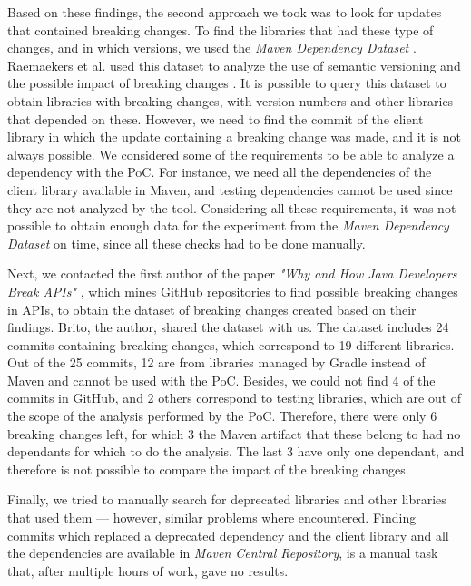 Based on these findings, the second approach we took was to look for updates that contained breaking changes. To find the libraries that had these type of changes, and in which versions, we used the \textit{Maven Dependency Dataset} \cite{Raemaekers2013}. Raemaekers et al. used this dataset to analyze the use of semantic versioning and the possible impact of breaking changes \cite{Raemaekers2017}. It is possible to query this dataset to obtain libraries with breaking changes, with version numbers and other libraries that depended on these. However, we need to find the commit of the client library in which the update containing a breaking change was made, and it is not always possible. We considered some of the requirements to be able to analyze a dependency with the PoC. For instance, we need all the dependencies of the client library available in Maven, and testing dependencies cannot be used since they are not analyzed by the tool. Considering all these requirements, it was not possible to obtain enough data for the experiment from the \textit{Maven Dependency Dataset} on time, since all these checks had to be done manually.

Next, we contacted the first author of the paper \textit{"Why and How Java Developers Break APIs"} \cite{Brito2018}, which mines GitHub repositories to find possible breaking changes in APIs, to obtain the dataset of breaking changes created based on their findings. Brito, the author, shared the dataset with us. The dataset includes 24 commits containing breaking changes, which correspond to 19 different libraries. Out of the 25 commits, 12 are from libraries managed by Gradle instead of Maven and cannot be used with the PoC. Besides, we could not find 4 of the commits in GitHub, and 2 others correspond to testing libraries, which are out of the scope of the analysis performed by the PoC. Therefore, there were only 6 breaking changes left, for which 3 the Maven artifact that these belong to had no dependants for which to do the analysis. The last 3 have only one dependant, and therefore is not possible to compare the impact of the breaking changes.

Finally, we tried to manually search for deprecated libraries and other libraries that used them — however, similar problems where encountered. Finding commits which replaced a deprecated dependency and the client library and all the dependencies are available in \textit{Maven Central Repository}, is a manual task that, after multiple hours of work, gave no results.


